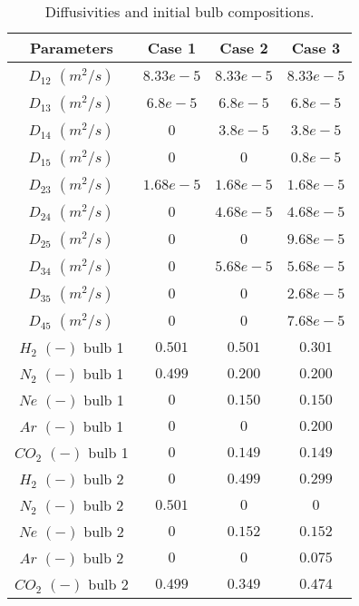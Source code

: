 \documentclass[11]{Report}
\begin{document}
    
\begin{table}[h!]
  \begin{center}
  \caption{Diffusivities and initial bulb compositions.}
    \label{tab:table1}
    \begin{tabular}{c|c|c|c} %
      \hline
      Parameters &      Case 1      &      Case 2      &      Case 3      \\
      \hline
      $D_{12}$ $(m^2 / s)$ & $8.33e-5$ & $8.33e-5$ & $8.33e-5$\\
      $D_{13}$ $(m^2 / s)$ & $6.8e-5$ & $6.8e-5$ & $6.8e-5$\\
      $D_{14}$ $(m^2 / s)$ & $0$ & $3.8e-5$ & $3.8e-5$\\
      $D_{15}$ $(m^2 / s)$ & $0$ & $0$ & $0.8e-5$ \\
      $D_{23}$ $(m^2 / s)$ & $1.68e-5$ & $1.68e-5$ & $1.68e-5$ \\
      $D_{24}$ $(m^2 / s)$ & $0$ & $4.68e-5$ & $4.68e-5$ \\
      $D_{25}$ $(m^2 / s)$ & $0$ & $0$ & $9.68e-5$ \\
      $D_{34}$ $(m^2 / s)$ & $0$ & $5.68e-5$ & $5.68e-5$ \\
      $D_{35}$ $(m^2 / s)$ & $0$ & $0$ & $2.68e-5$ \\
      $D_{45}$ $(m^2 / s)$ & $0$ & $0$ & $7.68e-5$ \\
      $H_2$ $(-)$ bulb 1 & $0.501$ & $0.501$ & $0.301$ \\    
      $N_2$ $(-)$ bulb 1 & $0.499$ & $0.200$ & $0.200$ \\      
      $Ne$ $(-)$ bulb 1 & $0$ & $0.150$ & $0.150$ \\     
      $Ar$ $(-)$ bulb 1 & $0$ & $0$ & $0.200$ \\
      $CO_2$ $(-)$ bulb 1 & $0$ & $0.149$ & $0.149$ \\
      $H_2$ $(-)$ bulb 2 & $0$ & $0.499$ & $0.299$ \\
      $N_2$ $(-)$ bulb 2 & $0.501$ & $0$ & $0$ \\
      $Ne$ $(-)$ bulb 2 & $0$ & $0.152$ & $0.152$ \\
      $Ar$ $(-)$ bulb 2 & $0$ & $0$ & $0.075$ \\
      $CO_2$ $(-)$ bulb 2 & $0.499$ & $0.349$ & $0.474$ \\         
      \hline
    \end{tabular}
  \end{center}
\end{table}
\end{document}
